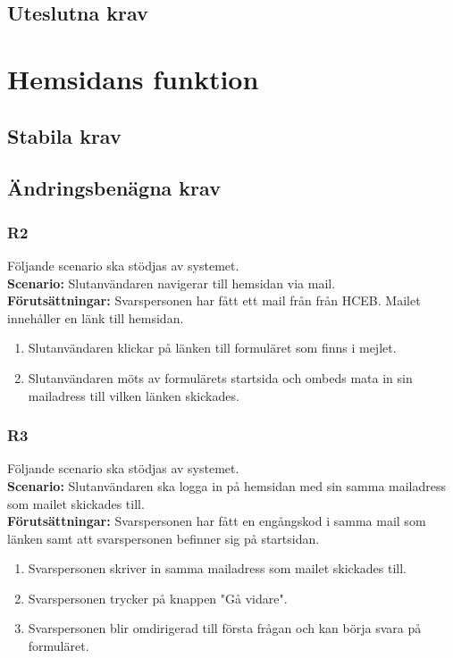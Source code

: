 \documentclass{article}
\begin{document}
    \subsection*{Uteslutna krav}
    
    \section{Hemsidans funktion}
    
    \subsection*{Stabila krav}
    \subsection*{Ändringsbenägna krav}
    
      \subsubsection*{R2}
    Följande scenario ska stödjas av systemet.
        \\
       \indent \textbf{Scenario:} Slutanvändaren navigerar till hemsidan via mail.
        \\
       \indent \textbf{Förutsättningar:} Svarspersonen har fått ett mail från från HCEB. Mailet innehåller en länk till hemsidan.
            \begin{enumerate}
                \item Slutanvändaren klickar på länken till formuläret som finns i mejlet.
                \item Slutanvändaren möts av formulärets startsida och ombeds mata in sin mailadress till vilken länken skickades. 
            \end{enumerate}
            
        \subsubsection*{R3}
    Följande scenario ska stödjas av systemet.
        \\
       \indent \textbf{Scenario:} Slutanvändaren ska logga in på hemsidan med sin samma mailadress som mailet skickades till.
        \\
       \indent \textbf{Förutsättningar:} Svarspersonen har fått en engångskod i samma mail som länken samt att svarspersonen befinner sig på startsidan.
            \begin{enumerate}
               \item Svarspersonen skriver in samma mailadress som mailet skickades till.
               \item Svarspersonen trycker på knappen "Gå vidare".
                \item  Svarspersonen blir omdirigerad till första frågan och kan börja svara på formuläret.
            \end{enumerate}
   
\end{document}
